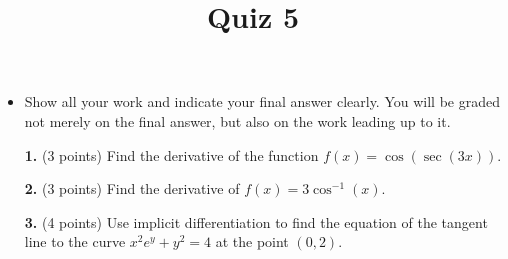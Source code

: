 \documentclass[12pt]{amsart}
\title{Quiz 5}
\begin{document}
\maketitle
\thispagestyle{fancy}

\begin{itemize}
\item Show all your work and indicate your final
answer clearly. You will be graded not merely on the final answer, but also on the work leading up to it.
\end{itemize}
\vskip0.25in
\begin{enumerate}


\item[\textbf{1. }] (3 points) Find the derivative of the function $f(x) = \cos(\sec(3x))$.

\vskip 2in

\item[\textbf{2. }] (3 points) Find the derivative of $f(x) = 3 \cos^{-1}(x)$.

\vskip 2in

\item[\textbf{3. }] (4 points) Use implicit differentiation to find the equation of the tangent line to
the curve $x^2e^y + y^2 = 4$ at the point $(0,2)$.


\end{enumerate}
\end{document}
